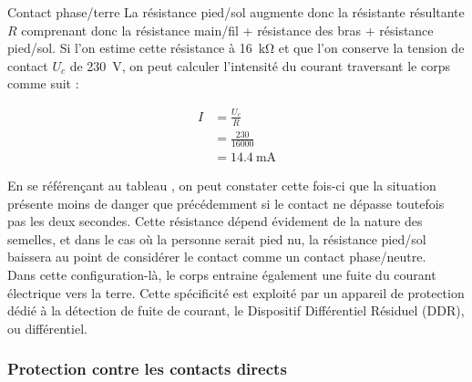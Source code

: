 \documentclass[a4paper, 11pt, twoside, fleqn]{memoir}
\begin{document}
\begin{exemple}{Contact phase/terre}{}
La résistance pied/sol augmente donc la résistante résultante \(R\) comprenant donc la résistance main/fil + résistance des bras + résistance pied/sol. Si l'on estime cette résistance à \SI{16}{\kilo\ohm} et que l'on conserve la tension de contact \(U_c\) de \SI{230}{\volt}, on peut calculer l'intensité du courant traversant le corps comme suit :

\begin{align*}
I 	&= \frac{U_c}{R} \\
	&= \frac{230}{16000} \\
	&= \SI{14,4}{\milli\ampere}
\end{align*}

En se référençant au tableau , on peut constater cette fois-ci que la situation présente moins de danger que précédemment si le contact ne dépasse toutefois pas les deux secondes. Cette résistance dépend évidement de la nature des semelles, et dans le cas où la personne serait pied nu, la résistance pied/sol baissera au point de considérer le contact comme un contact phase/neutre.\\

Dans cette configuration-là, le corps entraine également une fuite du courant électrique vers la terre. Cette spécificité est exploité par un appareil de protection dédié à la détection de fuite de courant, le Dispositif Différentiel Résiduel (DDR), ou différentiel.
\end{exemple}

\subsubsection{Protection contre les contacts directs}
\end{document}
